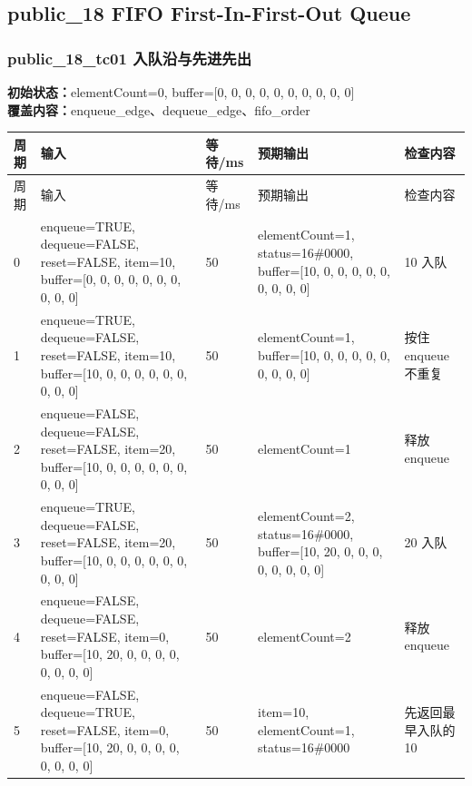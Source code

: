 \subsection{{\ttfamily public\_18} FIFO First-In-First-Out Queue}

\subsubsection{{\ttfamily public\_18\_tc01} 入队沿与先进先出}

\noindent\textbf{初始状态：}elementCount=0, buffer=[0, 0, 0, 0, 0, 0, 0, 0, 0, 0]\\

\textbf{覆盖内容：}enqueue\_edge、dequeue\_edge、fifo\_order

\begin{longtable}{L{1.0cm}L{4.7cm}L{1.4cm}L{4.0cm}L{2.1cm}}

\toprule

周期 & 输入 & 等待/ms & 预期输出 & 检查内容\\

\midrule

\endfirsthead

\toprule

周期 & 输入 & 等待/ms & 预期输出 & 检查内容\\

\midrule

\endhead

0 & enqueue=TRUE, dequeue=FALSE, reset=FALSE, item=10, buffer=[0, 0, 0, 0, 0, 0, 0, 0, 0, 0] & 50 & elementCount=1, status=16\#0000, buffer=[10, 0, 0, 0, 0, 0, 0, 0, 0, 0] & 10 入队\\

1 & enqueue=TRUE, dequeue=FALSE, reset=FALSE, item=10, buffer=[10, 0, 0, 0, 0, 0, 0, 0, 0, 0] & 50 & elementCount=1, buffer=[10, 0, 0, 0, 0, 0, 0, 0, 0, 0] & 按住 enqueue 不重复\\

2 & enqueue=FALSE, dequeue=FALSE, reset=FALSE, item=20, buffer=[10, 0, 0, 0, 0, 0, 0, 0, 0, 0] & 50 & elementCount=1 & 释放 enqueue\\

3 & enqueue=TRUE, dequeue=FALSE, reset=FALSE, item=20, buffer=[10, 0, 0, 0, 0, 0, 0, 0, 0, 0] & 50 & elementCount=2, status=16\#0000, buffer=[10, 20, 0, 0, 0, 0, 0, 0, 0, 0] & 20 入队\\

4 & enqueue=FALSE, dequeue=FALSE, reset=FALSE, item=0, buffer=[10, 20, 0, 0, 0, 0, 0, 0, 0, 0] & 50 & elementCount=2 & 释放 enqueue\\

5 & enqueue=FALSE, dequeue=TRUE, reset=FALSE, item=0, buffer=[10, 20, 0, 0, 0, 0, 0, 0, 0, 0] & 50 & item=10, elementCount=1, status=16\#0000 & 先返回最早入队的 10\\

\bottomrule

\end{longtable}

